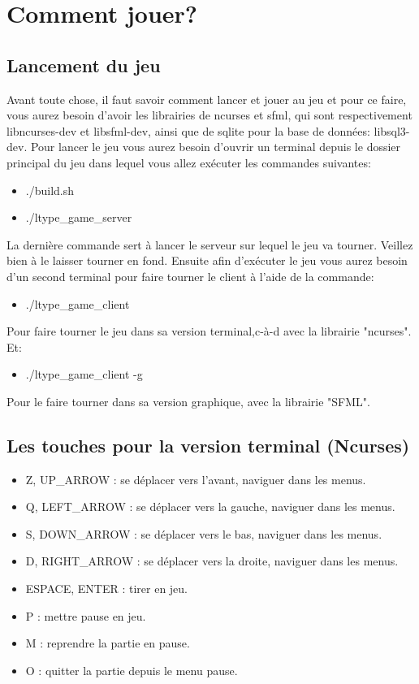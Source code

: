 \documentclass[french]{article}
\begin{document}
\section{Comment jouer?}
\subsection {Lancement du jeu}
Avant toute chose, il faut savoir comment lancer et jouer au jeu et pour ce faire, vous aurez besoin d'avoir les librairies de ncurses et sfml, qui sont respectivement libncurses-dev et libsfml-dev, ainsi que de sqlite pour la base de données: libsql3-dev. Pour lancer le jeu vous aurez besoin d'ouvrir un terminal depuis le dossier principal du jeu dans lequel vous allez exécuter les commandes suivantes:
\begin{itemize}
    \item ./build.sh
    \item ./ltype\_game\_server\newline
\end{itemize}

La dernière commande sert à lancer le serveur sur lequel le jeu va tourner. Veillez bien à le laisser tourner en fond.
Ensuite afin d'exécuter le jeu vous aurez besoin d'un second terminal pour faire tourner le client à l'aide de la commande:
\begin{itemize}
    \item ./ltype\_game\_client\newline
\end{itemize}
Pour faire tourner le jeu dans sa version terminal,c-à-d avec la librairie "ncurses". Et:
\begin{itemize}
    \item ./ltype\_game\_client -g\newline
\end{itemize}
Pour le faire tourner dans sa version graphique, avec la librairie "SFML".
\subsection {Les touches pour la version terminal (Ncurses)}
\begin{itemize}
    \item Z, UP\_ARROW    : se déplacer vers l'avant, naviguer dans les menus.
    \item Q, LEFT\_ARROW  : se déplacer vers la gauche, naviguer dans les menus.
    \item S, DOWN\_ARROW  : se déplacer vers le bas, naviguer dans les menus.
    \item D, RIGHT\_ARROW : se déplacer vers la droite, naviguer dans les menus.
    \item ESPACE, ENTER   : tirer en jeu.
    \item P               : mettre pause en jeu.
    \item M               : reprendre la partie en pause.
    \item O               : quitter la partie depuis le menu pause.\newline
\end{itemize}
\end{document}

